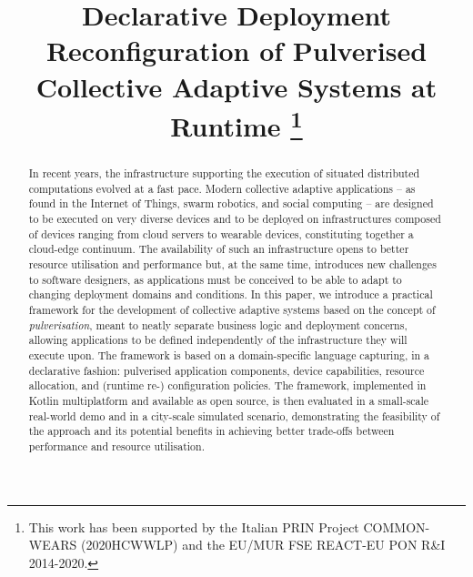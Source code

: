 \documentclass[conference]{IEEEtran}
\begin{document}
\title{Declarative Deployment Reconfiguration of Pulverised Collective Adaptive Systems at Runtime
\thanks{
    This work has been supported by the Italian PRIN Project COMMON-WEARS (2020HCWWLP) and the EU/MUR FSE REACT-EU PON R\&I 2014-2020.
}
}

\author{
}

\maketitle

\begin{abstract}
In recent years,
the infrastructure supporting the execution of situated distributed computations
evolved at a fast pace.
%
Modern collective adaptive applications -- as found in the Internet of Things, swarm robotics, and social computing -- are designed to be executed on very diverse devices
and to be deployed on infrastructures composed of devices ranging from cloud servers to wearable devices,
constituting together a cloud-edge continuum.
%
The availability of such an infrastructure opens to better resource utilisation and performance
but, at the same time, introduces new challenges to software designers,
as applications must be conceived to be able to adapt to changing deployment domains and conditions.
%
In this paper,
we introduce a practical framework for the development of collective adaptive systems
based on the concept of \emph{pulverisation},
meant to neatly separate business logic and deployment concerns,
allowing applications to be defined independently of the infrastructure they will execute upon.
%
The framework is based on a domain-specific language capturing, in a declarative fashion:
pulverised application components, device capabilities, resource allocation, and (runtime re-) configuration policies.
%
The framework, implemented in Kotlin multiplatform and available as open source,
is then evaluated in a small-scale real-world demo and in a city-scale simulated scenario,
demonstrating the feasibility of the approach
and its potential benefits in achieving better trade-offs between performance and resource utilisation.
\end{abstract}
\end{document}
